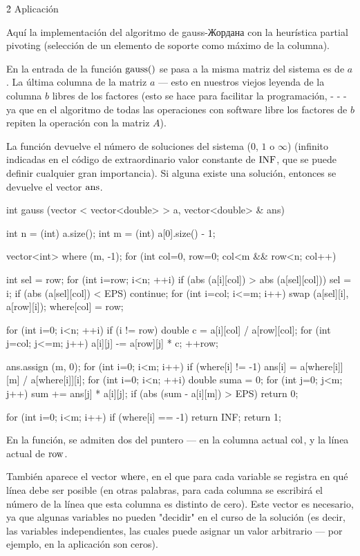 \h2{ Aplicación }

Aquí la implementación del algoritmo de gauss-Жордана con la heurística partial pivoting (selección de un elemento de soporte como máximo de la columna).

En la entrada de la función $\rm gauss()$ se pasa a la misma matriz del sistema es de $a$. La última columna de la matriz $a$ --- esto en nuestros viejos leyenda de la columna $b$ libres de los factores (esto se hace para facilitar la programación, - - - ya que en el algoritmo de todas las operaciones con software libre los factores de $b$ repiten la operación con la matriz $A$).

La función devuelve el número de soluciones del sistema ($0$, $1$ o $\infty$) (infinito indicadas en el código de extraordinario valor constante de $\rm INF$, que se puede definir cualquier gran importancia). Si alguna existe una solución, entonces se devuelve el vector $\rm ans$.

\code
int gauss (vector < vector<double> > a, vector<double> & ans) {
int n = (int) a.size();
int m = (int) a[0].size() - 1;

vector<int> where (m, -1);
for (int col=0, row=0; col<m && row<n; col++) {
int sel = row;
for (int i=row; i<n; ++i)
if (abs (a[i][col]) > abs (a[sel][col]))
sel = i;
if (abs (a[sel][col]) < EPS)
continue;
for (int i=col; i<=m; i++)
swap (a[sel][i], a[row][i]);
where[col] = row;

for (int i=0; i<n; ++i)
if (i != row) {
double c = a[i][col] / a[row][col];
for (int j=col; j<=m; j++)
a[i][j] -= a[row][j] * c;
}
++row;
}

ans.assign (m, 0);
for (int i=0; i<m; i++)
if (where[i] != -1)
ans[i] = a[where[i]][m] / a[where[i]][i];
for (int i=0; i<n; ++i) {
double suma = 0;
for (int j=0; j<m; j++)
sum += ans[j] * a[i][j];
if (abs (sum - a[i][m]) > EPS)
return 0;
}

for (int i=0; i<m; i++)
if (where[i] == -1)
return INF;
return 1;
}
\endcode

En la función, se admiten dos del puntero --- en la columna actual $\rm col$, y la línea actual de $\rm row$.

También aparece el vector $\rm where$, en el que para cada variable se registra en qué línea debe ser posible (en otras palabras, para cada columna se escribirá el número de la línea que esta columna es distinto de cero). Este vector es necesario, ya que algunas variables no pueden "decidir" en el curso de la solución (es decir, las variables independientes, las cuales puede asignar un valor arbitrario --- por ejemplo, en la aplicación son ceros).

